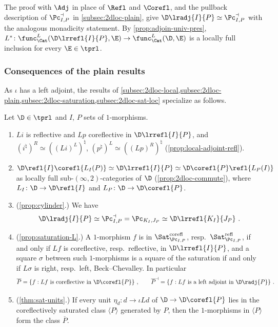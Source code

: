 The proof with $\Adj$ in place of $\Refl$ and $\Corefl$, and the pullback description of $\Pc^{\dashv}_{I,P}$ in \cref{subsec:2dloc-plain}, give $\D\lradj{I}{P} \simeq \Pc^{\dashv}_{I,P}$ with the analogous monadicity statement.
By \cref{prop:adjoin-univ-pres}, $L^{*}\colon \func^{L}_{\Cat}(\D\lrrefl{I}{P},\E) \to \func^{L}_{\Cat}(\D,\E)$ is a locally full inclusion for every $\E \in \tprl$.

\subsubsection*{Consequences of the plain results}
As $\iota$ has a left adjoint, the results of \cref{subsec:2dloc-local,subsec:2dloc-plain,subsec:2dloc-saturation,subsec:2dloc-sat-loc} specialize as follows.

\begin{cor}
\label{cor:presentable}
Let $\D \in \tprl$ and $I$, $P$ sets of $1$-morphisms.
\begin{enumerate}
\item $Li$ is reflective and $Lp$ coreflective in $\D\lrrefl{I}{P}$, and $(i^{\natural})^{R} \simeq ((Li)^{L})^{\natural}$, $(p^{\natural})^{L} \simeq ((Lp)^{R})^{\natural}$ (\cref{prop:local-adjoint-refl}).
\item $\D\refl{I}\corefl{L_{I}(P)} \simeq \D\lrrefl{I}{P} \simeq \D\corefl{P}\refl{L_{P}(I)}$ as locally full sub-$(\infty,2)$-categories of $\D$ (\cref{prop:2dloc-commute}), where $L_{I}\colon \D \to \D\refl{I}$ and $L_{P}\colon \D \to \D\corefl{P}$.
\item (\cref{prop:cylinder}.) We have
\[
\D\lradj{I}{P} \simeq \Pc^{\dashv}_{I,P} = \Pc_{K_{I},J_{P}} \simeq \D\lrrefl{K_{I}}{J_{P}} \ .
\]
\item (\cref{prop:saturation-L}.) A $1$-morphism $f$ is in $\Sat^{\mathrm{corefl}}_{\Pc_{I,P}}$, resp.\ $\Sat^{\mathrm{refl}}_{\Pc_{I,P}}$, if and only if $Lf$ is coreflective, resp.\ reflective, in $\D\lrrefl{I}{P}$, and a square $\sigma$ between such $1$-morphisms is a square of the saturation if and only if $L\sigma$ is right, resp.\ left, Beck--Chevalley. In particular
\[
\overline{P} = \{f : Lf \text{ is coreflective in } \D\corefl{P}\} \ , \qquad \overline{P}^{\dashv} = \{f : Lf \text{ is a left adjoint in } \D\radj{P}\} \ .
\]
\item (\cref{thm:sat-units}.) If every unit $\eta_{d}\colon d \to \iota L d$ of $\D \to \D\corefl{P}$ lies in the coreflectively saturated class $\langle P \rangle$ generated by $P$, then the $1$-morphisms in $\langle P \rangle$ form the class $\overline{P}$.
\end{enumerate}
\end{cor}

